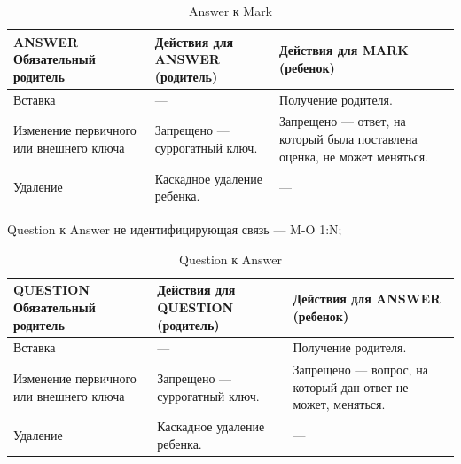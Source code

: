 \documentclass[a4paper, 14pt]{extarticle}
\begin{document}
\begin{table}[H]
\centering
\caption{Answer к Mark}
\begin{tabular}{|>{\centering\arraybackslash}m{4cm}|>{\RaggedRight}m{6cm}|>{\RaggedRight}m{6cm}|}
\hline
\textbf{ANSWER Обязательный родитель} & \textbf{Действия для ANSWER (родитель)} & \textbf{Действия для MARK (ребенок)} \\
\hline
Вставка & — & Получение родителя. \\
\hline
Изменение первичного или внешнего ключа & Запрещено — суррогатный ключ. & Запрещено — ответ, на который была поставлена оценка, не может меняться. \\
\hline
Удаление & Каскадное удаление ребенка. & — \\
\hline
\end{tabular}
\end{table}


Question к Answer не идентифицирующая связь — M-O 1:N;

\begin{table}[H]
\centering
\caption{Question к Answer}
\begin{tabular}{|>{\centering\arraybackslash}m{4cm}|>{\RaggedRight}m{6cm}|>{\RaggedRight}m{6cm}|}
\hline
\textbf{QUESTION Обязательный родитель} & \textbf{Действия для QUESTION (родитель)} & \textbf{Действия для ANSWER (ребенок)} \\
\hline
Вставка & — & Получение родителя. \\
\hline
Изменение первичного или внешнего ключа & Запрещено — суррогатный ключ. & Запрещено — вопрос, на который дан ответ не может, меняться. \\
\hline
Удаление & Каскадное удаление ребенка. & — \\
\hline
\end{tabular}
\end{table}
\end{document}
